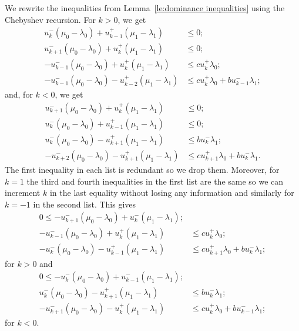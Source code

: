 \documentclass[pdflatex,sn-mathphys]{sn-jnl}%
\theoremstyle{thmstyleone}%
\theoremstyle{thmstyletwo}%
\theoremstyle{thmstylethree}%
\begin{document}
  We rewrite the inequalities from Lemma~\ref{le:dominance inequalities} using the Chebyshev recursion.
  For $k>0$, we get
  \begin{align*}
    u_k^-(\mu_0-\lambda_0)+u_{k-1}^+(\mu_1-\lambda_1) &\le 0;\\
    u_{k+1}^-(\mu_0-\lambda_0)+u_k^+(\mu_1-\lambda_1) &\le 0;\\
    -u_{k-1}^-(\mu_0-\lambda_0)+u_k^+(\mu_1-\lambda_1) &\le cu_k^+\lambda_0;\\
    -u_{k-1}^-(\mu_0-\lambda_0)-u_{k-2}^+(\mu_1-\lambda_1) &\le cu_k^+\lambda_0+bu_{k-1}^-\lambda_1;
  \end{align*}
  and, for $k<0$, we get
  \begin{align*}
    u_{k+1}^-(\mu_0-\lambda_0)+u_k^+(\mu_1-\lambda_1) &\le 0;\\
    u_k^-(\mu_0-\lambda_0)+u_{k-1}^+(\mu_1-\lambda_1) &\le 0;\\
    u_k^-(\mu_0-\lambda_0)-u_{k+1}^+(\mu_1-\lambda_1) &\le bu_k^-\lambda_1;\\
    -u_{k+2}^-(\mu_0-\lambda_0)-u_{k+1}^+(\mu_1-\lambda_1) &\le cu_{k+1}^+\lambda_0+bu_k^-\lambda_1.
  \end{align*}
  The first inequality in each list is redundant so we drop them.
  Moreover, for $k=1$ the third and fourth inequalities in the first list are the same so we can increment $k$ in the last equality without losing any information and similarly for $k=-1$ in the second list. 
  This gives
  \begin{align*}
    0 \le -u_{k+1}^-(\mu_0-\lambda_0)+u_k^-(\mu_1-\lambda_1); &\\
    -u_{k-1}^-(\mu_0-\lambda_0)+u_k^+(\mu_1-\lambda_1) &\le cu_k^+\lambda_0;\\
    -u_k^-(\mu_0-\lambda_0)-u_{k-1}^+(\mu_1-\lambda_1) &\le cu_{k+1}^+\lambda_0+bu_k^-\lambda_1;
  \end{align*}
  for $k>0$ and
  \begin{align*}
    0 \le -u_k^-(\mu_0-\lambda_0)+u_{k-1}^-(\mu_1-\lambda_1); &\\
    u_k^-(\mu_0-\lambda_0)-u_{k+1}^+(\mu_1-\lambda_1) &\le bu_k^-\lambda_1;\\
    -u_{k+1}^-(\mu_0-\lambda_0)-u_k^+(\mu_1-\lambda_1) &\le cu_k^+\lambda_0+bu_{k-1}^-\lambda_1;
  \end{align*}
  for $k<0$.
\end{document}
